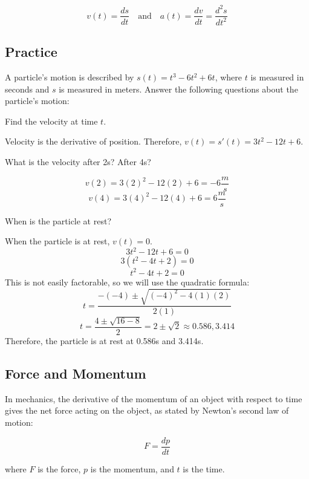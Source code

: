 \begin{equation}
v(t) = \frac{ds}{dt} \quad \text{and} \quad a(t) = \frac{dv}{dt} = \frac{d^2s}{dt^2}
\end{equation}

\subsection{Practice}

A particle's motion is described by $s(t) = t^3-6t^2+6t$, where $t$ is measured 
in seconds and $s$ is measured in meters. Answer the following questions about 
the particle's motion:
\begin{Exercise}[label=velacc1]
Find the velocity at time $t$.
\end{Exercise}

\begin{Answer}[ref=velacc1]
Velocity is the derivative of position. Therefore, $v(t) = s'(t) = 3t^2-12t+6$.
\end{Answer}

\begin{Exercise}[label=velacc2]
What is the velocity after 2s? After 4s?
\end{Exercise}

\begin{Answer}[ref=velacc2]
$$v(2) = 3(2)^2-12(2)+6=-6 \frac{m}{s}$$
$$v(4) = 3(4)^2-12(4)+6=6\frac{m}{s}$$
\end{Answer}

\begin{Exercise}[label=velacc3]
When is the particle at rest?
\end{Exercise}

\begin{Answer}[ref=velacc3]
When the particle is at rest, $v(t) = 0$. 
$$3t^2-12t+6=0$$
$$3(t^2-4t+2)=0$$
$$t^2-4t+2=0$$
This is not easily factorable, so we will use the quadratic formula: $$t=\frac{-(-4)\pm\sqrt{(-4)^2-4(1)(2)}}{2(1)}$$
$$t=\frac{4\pm\sqrt{16-8}}{2}=2\pm\sqrt{2}\approx0.586, 3.414$$
Therefore, the particle is at rest at 0.586s and 3.414s.
\end{Answer}

\subsection{Force and Momentum}

In mechanics, the derivative of the momentum of an object with respect to time gives the net force acting on the object, as stated by Newton's second law of motion:

\begin{equation}
F = \frac{dp}{dt}
\end{equation}

where $F$ is the force, $p$ is the momentum, and $t$ is the time.
